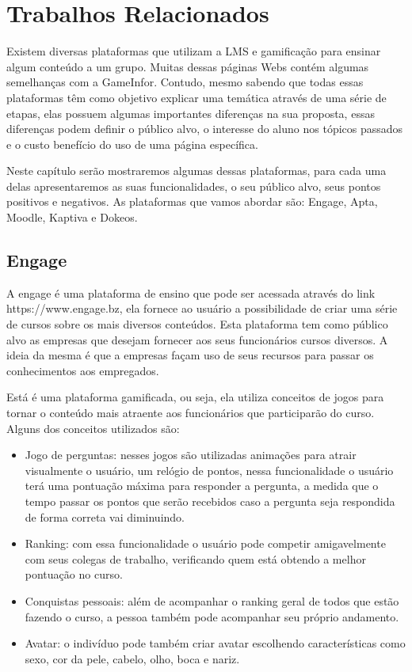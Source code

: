 \chapter{Trabalhos Relacionados}
\label{ch:trabalhosRelacionados}

Existem diversas plataformas que utilizam a LMS e gamificação para ensinar algum conteúdo a um grupo. Muitas dessas páginas Webs contém algumas semelhanças com a GameInfor. Contudo, mesmo sabendo que todas essas plataformas  têm como objetivo explicar uma temática através de uma série de etapas, elas possuem algumas importantes diferenças na sua proposta, essas diferenças podem definir o público alvo, o interesse do aluno nos tópicos passados e o custo benefício do uso de uma página específica.

Neste capítulo serão mostraremos algumas dessas plataformas, para cada uma delas apresentaremos as suas funcionalidades, o seu público alvo, seus pontos positivos e negativos. As plataformas que vamos abordar são: Engage, Apta, Moodle, Kaptiva e Dokeos.

\section{Engage}

A engage é uma plataforma de ensino que pode ser acessada através do link https://www.engage.bz, ela fornece ao usuário a possibilidade de criar uma série de cursos sobre os mais diversos conteúdos. Esta plataforma tem como público alvo as empresas que desejam fornecer aos seus funcionários cursos diversos. A ideia da mesma é que a empresas façam uso de seus recursos para passar os conhecimentos aos empregados.

Está é uma plataforma gamificada, ou seja, ela utiliza conceitos de jogos para tornar o conteúdo mais atraente aos funcionários que participarão do curso. Alguns dos conceitos utilizados são:

\begin{itemize}
\item Jogo de perguntas: nesses jogos são utilizadas animações para atrair visualmente o usuário, um relógio de pontos, nessa funcionalidade o usuário terá uma pontuação máxima para responder a pergunta, a medida que o tempo passar os pontos que serão recebidos caso a pergunta seja respondida de forma correta vai diminuindo.
\item Ranking: com essa funcionalidade o usuário pode competir amigavelmente com seus colegas de trabalho, verificando quem está obtendo a melhor pontuação no curso.
\item Conquistas pessoais: além de acompanhar o ranking geral de todos que estão fazendo o curso, a pessoa também pode acompanhar seu próprio andamento.
\item Avatar: o indivíduo pode também criar avatar escolhendo características como sexo, cor da pele, cabelo, olho, boca e nariz.
\end{itemize}

